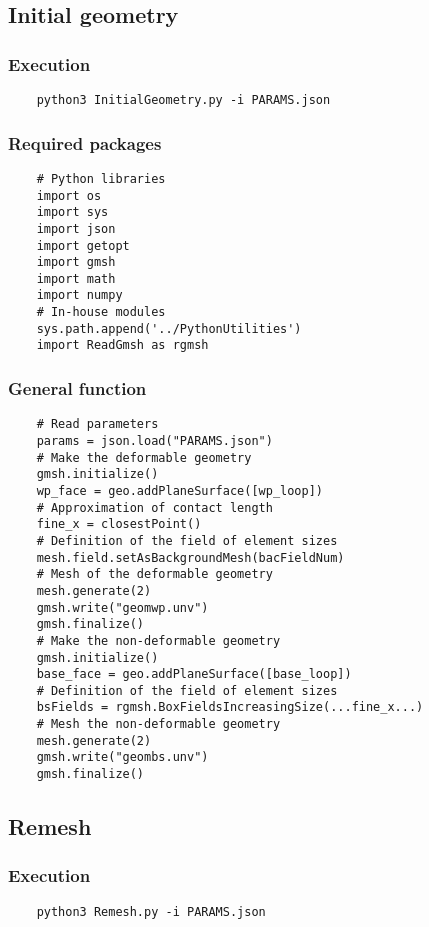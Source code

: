 \documentclass{article}
\begin{document}
\subsection{Initial geometry}
\subsubsection{Execution}
\begin{verbatim}
    python3 InitialGeometry.py -i PARAMS.json
\end{verbatim}
\subsubsection{Required packages}
\begin{verbatim}
    # Python libraries
    import os
    import sys
    import json
    import getopt
    import gmsh
    import math
    import numpy
    # In-house modules
    sys.path.append('../PythonUtilities')
    import ReadGmsh as rgmsh
\end{verbatim}
\subsubsection{General function}
\begin{verbatim}
    # Read parameters
    params = json.load("PARAMS.json")
    # Make the deformable geometry
    gmsh.initialize()
    wp_face = geo.addPlaneSurface([wp_loop])
    # Approximation of contact length
    fine_x = closestPoint()
    # Definition of the field of element sizes
    mesh.field.setAsBackgroundMesh(bacFieldNum)
    # Mesh of the deformable geometry
    mesh.generate(2)
    gmsh.write("geomwp.unv")
    gmsh.finalize()
    # Make the non-deformable geometry
    gmsh.initialize()
    base_face = geo.addPlaneSurface([base_loop])
    # Definition of the field of element sizes
    bsFields = rgmsh.BoxFieldsIncreasingSize(...fine_x...)
    # Mesh the non-deformable geometry
    mesh.generate(2)
    gmsh.write("geombs.unv")
    gmsh.finalize()
\end{verbatim}

\subsection{Remesh}
\subsubsection{Execution}
\begin{verbatim}
    python3 Remesh.py -i PARAMS.json
\end{verbatim}
\end{document}
